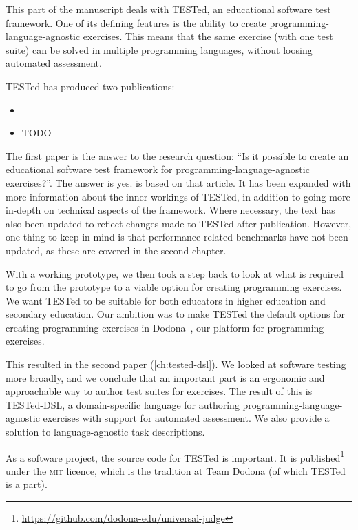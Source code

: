 \documentclass[./main]{subfiles}
\begin{document}
This part of the manuscript deals with TESTed, an educational software test framework.
One of its defining features is the ability to create programming-language-agnostic exercises.
This means that the same exercise (with one test suite) can be solved in multiple programming languages, without loosing automated assessment.

TESTed has produced two publications:

\begin{itemize}
    \item {}
    \item TODO
\end{itemize}

The first paper is the answer to the research question: ``Is it possible to create an educational software test framework for programming-language-agnostic exercises?''.
The answer is yes.
 is based on that article.
It has been expanded with more information about the inner workings of TESTed, in addition to going more in-depth on technical aspects of the framework.
Where necessary, the text has also been updated to reflect changes made to TESTed after publication.
However, one thing to keep in mind is that performance-related benchmarks have not been updated, as these are covered in the second chapter.

With a working prototype, we then took a step back to look at what is required to go from the prototype to a viable option for creating programming exercises.
We want TESTed to be suitable for both educators in higher education and secondary education.
Our ambition was to make TESTed the default options for creating programming exercises in Dodona~\autocite{vanpetegemDodonaLearnCode2023}, our platform for programming exercises.

This resulted in the second paper (\cref{ch:tested-dsl}).
We looked at software testing more broadly, and we conclude that an important part is an ergonomic and approachable way to author test suites for exercises.
The result of this is TESTed-DSL, a domain-specific language for authoring programming-language-agnostic exercises with support for automated assessment.
We also provide a solution to language-agnostic task descriptions.

As a software project, the source code for TESTed is important.
It is published\footnote{\url{https://github.com/dodona-edu/universal-judge}} under the \textsc{mit} licence, which is the tradition at Team Dodona (of which TESTed is a part).
\end{document}
